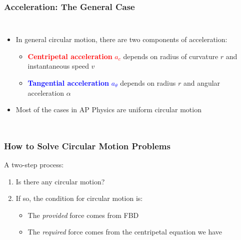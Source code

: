 \documentclass[12pt,compress,aspectratio=169]{beamer}
\newcommand{\mb}[1]{\ensuremath\mathbf{#1}}
\newcommand{\eq}[2]{\vspace{#1}{\Large\begin{displaymath}#2\end{displaymath}}}
\begin{document}
\begin{frame}
  \frametitle{Acceleration: The General Case}
  \begin{columns}
    
    \begin{itemize}
    \item In general circular motion, there are two components of acceleration:
      \begin{itemize}
      \item\textcolor{red}{\textbf{Centripetal acceleration} $a_c$} depends on
        radius of curvature $r$ and instantaneous speed $v$
      \item \textcolor{blue}{\textbf{Tangential acceleration} $a_\theta$}
        depends on radius $r$  and angular acceleration $\alpha$
      \end{itemize}
    \item Most of the cases in AP Physics are uniform circular motion
    \end{itemize}
  \end{columns}
\end{frame}


\begin{frame}
  \frametitle{How to Solve Circular Motion Problems}

  A two-step process:
  \begin{enumerate}
  \item Is there any circular motion?
  \item If so, the condition for circular motion is:

    \eq{-.2in}{
      \mb{F}_\mathrm{provided}=\mb{F}_\mathrm{required}
    }
    \begin{itemize}
    \item The \emph{provided} force comes from FBD
    \item The \emph{required} force comes from the centripetal equation we have
    \end{itemize}
  \end{enumerate}
\end{frame}
\end{document}
